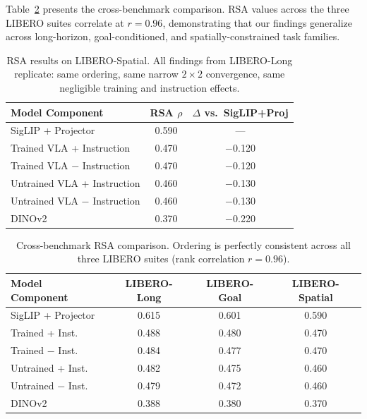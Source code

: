 \documentclass[10pt,letterpaper]{article}
\begin{document}
Table~\ref{tab:cross_bench} presents the cross-benchmark comparison.
RSA values across the three LIBERO suites correlate at $r{=}0.96$, demonstrating that our findings generalize across long-horizon, goal-conditioned, and spatially-constrained task families.

\begin{table}[t]
\centering
\caption{RSA results on LIBERO-Spatial. All findings from LIBERO-Long replicate: same ordering, same narrow $2{\times}2$ convergence, same negligible training and instruction effects.}
\label{tab:spatial}
\begin{tabular}{lcc}
\toprule
\textbf{Model Component} & \textbf{RSA $\rho$} & \textbf{$\Delta$ vs.\ SigLIP+Proj} \\
\midrule
SigLIP + Projector & 0.590 & --- \\
\midrule
Trained VLA + Instruction & 0.470 & $-$0.120 \\
Trained VLA $-$ Instruction & 0.470 & $-$0.120 \\
Untrained VLA + Instruction & 0.460 & $-$0.130 \\
Untrained VLA $-$ Instruction & 0.460 & $-$0.130 \\
\midrule
DINOv2 & 0.370 & $-$0.220 \\
\bottomrule
\end{tabular}
\end{table}

\begin{table}[t]
\centering
\caption{Cross-benchmark RSA comparison. Ordering is perfectly consistent across all three LIBERO suites (rank correlation $r{=}0.96$).}
\label{tab:cross_bench}
\begin{tabular}{lccc}
\toprule
\textbf{Model Component} & \textbf{LIBERO-Long} & \textbf{LIBERO-Goal} & \textbf{LIBERO-Spatial} \\
\midrule
SigLIP + Projector       & 0.615 & 0.601 & 0.590 \\
Trained + Inst.           & 0.488 & 0.480 & 0.470 \\
Trained $-$ Inst.         & 0.484 & 0.477 & 0.470 \\
Untrained + Inst.         & 0.482 & 0.475 & 0.460 \\
Untrained $-$ Inst.       & 0.479 & 0.472 & 0.460 \\
DINOv2                    & 0.388 & 0.380 & 0.370 \\
\bottomrule
\end{tabular}
\end{table}
\end{document}
